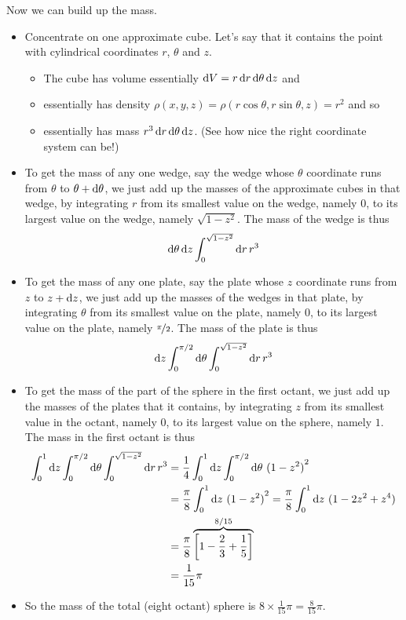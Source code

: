 \begin{eg}
Now we can build up the mass.
\begin{itemize}
\item
Concentrate on one approximate cube. Let's say that it contains the point 
with cylindrical coordinates $r$, $\theta$ and $z$.
\begin{itemize}
\item 
The cube has volume essentially $\mathrm{d}V=r\,\mathrm{d}r\,\mathrm{d}\theta\,\mathrm{d}z$
and
\item
essentially has density $\rho(x,y,z)=\rho(r\cos\theta,r\sin\theta,z) = r^2$ 
and so
\item 
essentially has mass $r^3\,\mathrm{d}r\,\mathrm{d}\theta\,\mathrm{d}z$.
(See how nice the right coordinate system can be!)
\end{itemize}

\item
To get the mass of any one wedge, say the wedge whose $\theta$ coordinate runs 
from $\theta$ to $\theta+\mathrm{d}\theta$, we just add up the masses of 
the approximate cubes in that wedge, by integrating $r$ from its smallest 
value on the wedge, namely $0$, to its largest value on the wedge, namely 
$\sqrt{1-z^2}$. The mass of the wedge is thus
\begin{align*}
\mathrm{d}\theta\,\mathrm{d}z \int_0^{\sqrt{1-z^2}}  \mathrm{d}r\,r^3
\end{align*}

\item
To get the mass of any one plate, say the plate whose $z$ coordinate runs 
from $z$ to $z+\mathrm{d}z$, we just add up the masses of the wedges 
in that plate, by integrating $\theta$ from its smallest value on 
the plate, namely $0$, to its largest value on the plate, namely 
$\nicefrac{\pi}{2}$. The mass of the plate is thus
\begin{align*}
\mathrm{d}z\int_0^{\pi/2}\mathrm{d}\theta\int_0^{\sqrt{1-z^2}}  \mathrm{d}r\,r^3
\end{align*}

\item
To get the mass of the part of the sphere in the first octant, we just 
add up the masses of the plates that it contains, by integrating $z$ from its smallest value in the octant, namely $0$, to its largest value on the sphere, 
namely  $1$. The mass in the first octant is thus
\begin{align*}
\int_0^1\mathrm{d}z\int_0^{\pi/2}\mathrm{d}\theta\int_0^{\sqrt{1-z^2}}  \mathrm{d}r\,r^3
&= \frac{1}{4}\int_0^1\mathrm{d}z\int_0^{\pi/2}\mathrm{d}\theta\ {(1-z^2)}^2 \\
&= \frac{\pi}{8}\int_0^1\mathrm{d}z\ {(1-z^2)}^2 
 =\frac{\pi}{8}\int_0^1\mathrm{d}z\ (1-2z^2+z^4)  \\
&= \frac{\pi}{8}\overbrace{\left[1-\frac{2}{3}+\frac{1}{5}\right]}^{8/15} \\
&=\frac{1}{15}\pi
\end{align*}
\item
So the mass of the total (eight octant) sphere is $8\times\frac{1}{15}\pi=\frac{8}{15}\pi$.
\end{itemize}


\end{eg}
